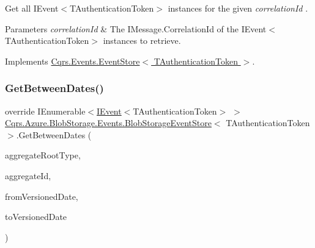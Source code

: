 Get all I\+Event$<$\+T\+Authentication\+Token$>$ instances for the given {\itshape correlation\+Id} . 


\begin{DoxyParams}{Parameters}
{\em correlation\+Id} & The I\+Message.\+Correlation\+Id of the I\+Event$<$\+T\+Authentication\+Token$>$ instances to retrieve.\\
\hline
\end{DoxyParams}


Implements \hyperlink{classCqrs_1_1Events_1_1EventStore_a0096646f5dff730b0041b9469719c420_a0096646f5dff730b0041b9469719c420}{Cqrs.\+Events.\+Event\+Store$<$ T\+Authentication\+Token $>$}.

\mbox{\label{classCqrs_1_1Azure_1_1BlobStorage_1_1Events_1_1BlobStorageEventStore_acbb5dac5daaf2eafbf76ab631e7827f8_acbb5dac5daaf2eafbf76ab631e7827f8}} 
\subsubsection{\texorpdfstring{Get\+Between\+Dates()}{GetBetweenDates()}}
{\footnotesize\ttfamily override I\+Enumerable$<$\hyperlink{interfaceCqrs_1_1Events_1_1IEvent}{I\+Event}$<$T\+Authentication\+Token$>$ $>$ \hyperlink{classCqrs_1_1Azure_1_1BlobStorage_1_1Events_1_1BlobStorageEventStore}{Cqrs.\+Azure.\+Blob\+Storage.\+Events.\+Blob\+Storage\+Event\+Store}$<$ T\+Authentication\+Token $>$.Get\+Between\+Dates (\begin{DoxyParamCaption}\item[{Type}]{aggregate\+Root\+Type,  }\item[{Guid}]{aggregate\+Id,  }\item[{Date\+Time}]{from\+Versioned\+Date,  }\item[{Date\+Time}]{to\+Versioned\+Date }\end{DoxyParamCaption})\hspace{0.3cm}{\ttfamily [virtual]}}



